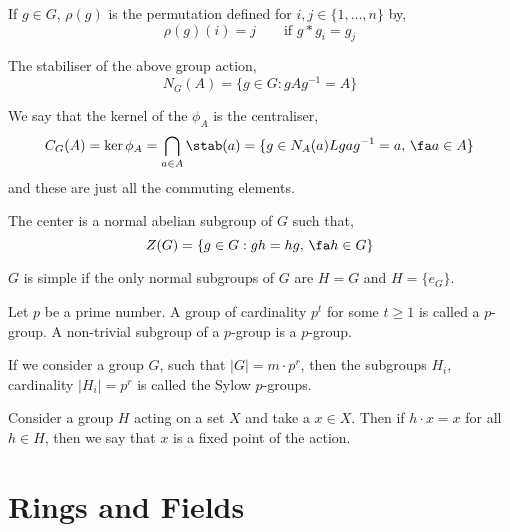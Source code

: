 \documentclass{article}
\begin{document}
\begin{ndefi}
  If $g \in G$, $\rho(g)$ is the permutation defined for $i,j \in \{1, \dots, n\}$ by,
  $$ \rho(g)(i) = j \qquad \text{if $g * g_i = g_j$} $$
\end{ndefi}

\begin{ndefi}[Normaliser]
  The stabiliser of the above group action,
  $$ N_G(A) = \{g \in G : gAg^{-1} = A\} $$
\end{ndefi}

\begin{ndefi}[Centraliser]
  We say that the kernel of the $\phi_A$ is the centraliser,
  $$C_G(A) = \ker \phi_A = \bigcap_{a \in A}\stab(a) = \{g \in N_A(a) L gag^{-1} = a,\,\fa a \in A\} $$
  and these are just all the commuting elements.
\end{ndefi}

\begin{ndefi}[Center of $G$]
  The center is a normal abelian subgroup of $G$ such that,
  $$ Z(G) = \{g \in G : gh = hg,\, \fa h \in G\} $$
\end{ndefi}

\begin{ndefi}
  $G$ is simple if the only normal subgroups of $G$ are $H = G$ and $H = \{e_G\}$.
\end{ndefi}

\begin{ndefi}[$p$-group]
  Let $p$ be a prime number. A group of cardinality $p^t$ for some $t \ge 1$ is called a $p$-group. A non-trivial subgroup of a $p$-group is a $p$-group.
\end{ndefi}

\begin{ndefi}
  If we consider a group $G$, such that $|G| = m \cdot p^r$, then the subgroups $H_i$, cardinality $|H_i| = p^r$ is called the Sylow $p$-groups.
\end{ndefi}

\begin{ndefi}
  Consider a group $H$ acting on a set $X$ and take a $x \in X$. Then if $h \cdot x = x$ for all $h \in H$, then we say that $x$ is a fixed point of the action.
\end{ndefi}

\section{Rings and Fields}
\end{document}
